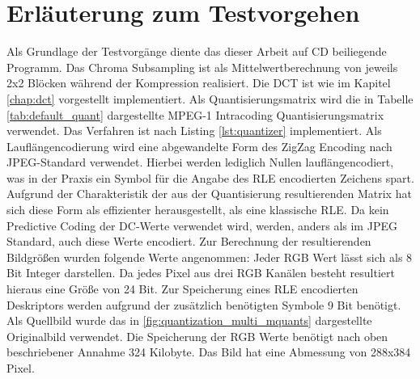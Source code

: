 \chapter{Erläuterung zum Testvorgehen}

Als Grundlage der Testvorgänge diente das dieser Arbeit auf CD beiliegende Programm. Das Chroma Subsampling ist als Mittelwertberechnung von jeweils 2x2 Blöcken während der Kompression realisiert. Die DCT ist wie im Kapitel \ref{chap:dct} vorgestellt implementiert. Als Quantisierungsmatrix wird die in Tabelle \ref{tab:default_quant} dargestellte MPEG-1 Intracoding Quantisierungsmatrix verwendet. Das Verfahren ist nach Listing \ref{lst:quantizer} implementiert. Als Lauflängencodierung wird eine abgewandelte Form des ZigZag Encoding nach JPEG-Standard verwendet. Hierbei werden lediglich Nullen lauflängencodiert, was in der Praxis ein Symbol für die Angabe des RLE encodierten Zeichens spart. Aufgrund der Charakteristik der aus der Quantisierung resultierenden Matrix hat sich diese Form als effizienter herausgestellt, als eine klassische RLE. Da kein Predictive Coding der DC-Werte verwendet wird, werden, anders als im JPEG Standard, auch diese Werte encodiert. Zur Berechnung der resultierenden Bildgrößen wurden folgende Werte angenommen: Jeder RGB Wert lässt sich als 8 Bit Integer darstellen. Da jedes Pixel aus drei RGB Kanälen besteht resultiert hieraus eine Größe von 24 Bit. Zur Speicherung eines RLE encodierten Deskriptors werden aufgrund der zusätzlich benötigten Symbole 9 Bit benötigt. Als Quellbild wurde das in \ref{fig:quantization_multi_mquants} dargestellte Originalbild verwendet. Die Speicherung der RGB Werte benötigt nach oben beschriebener Annahme 324 Kilobyte. Das Bild hat eine Abmessung von 288x384 Pixel.
